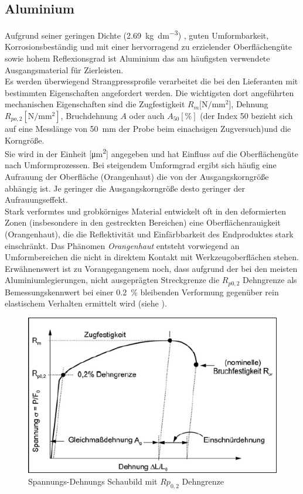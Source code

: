 \documentclass[12pt,a4paper,parskip,twoside,BCOR5mm,headsepline]{scrartcl}
\begin{document}
\subsection{Aluminium}
Aufgrund seiner geringen Dichte (\SI{2.69}{\kilo\gram\per\deci\meter\cubed}) \autocite[353]{wm}, guten Umformbarkeit, Korrosionsbeständig und mit einer hervorragend zu erzielender Oberflächengüte sowie hohem Reflexionsgrad ist Aluminium das am häufigsten verwendete Ausgangsmaterial für Zierleisten.\\
 Es werden überwiegend Strangpressprofile verarbeitet die bei den Lieferanten mit bestimmten Eigenschaften angefordert werden. Die wichtigsten dort angeführten mechanischen Eigenschaften sind die Zugfestigkeit $R_m  [\si{\newton\per\milli\meter\squared}$], Dehnung $R_{po,2} [\si{\newton\per\milli\meter\squared}]$,   Bruchdehnung $A$ oder auch $A_{50} [\si{\percent}]$ (der Index 50 bezieht sich auf eine Messlänge  von \SI{50}{\milli\meter} der Probe  beim einachsigen Zugversuch)\autocite[281]{aa}und die Korngröße.\\
  Sie wird in der Einheit [\si{\micro\meter\squared}] angegeben und hat Einfluss auf die Oberflächengüte nach  Umformprozessen. Bei steigendem Umformgrad ergibt sich häufig eine Aufrauung der Oberfläche (Orangenhaut)\label{sec:orangenhaut} die von der Ausgangskorngröße abhängig ist. Je geringer die Ausgangskorngröße desto geringer der Aufrauungseffekt.\autocite[524]{aa}\\ Stark verformtes und grobkörniges Material entwickelt oft in den deformierten Zonen (insbesondere in den gestreckten Bereichen) eine Oberflächenrauigkeit (Orangenhaut), die die Reflektivität und Einfärbbarkeit des Endproduktes stark einschränkt. Das Phänomen \emph{Orangenhaut} entsteht vorwiegend an Umformbereichen die nicht in direktem Kontakt mit Werkzeugoberflächen stehen.\autocite[19]{hmp}
Erwähnenswert ist zu Vorangegangenem noch, dass aufgrund der bei den meisten Aluminiumlegierungen, nicht ausgeprägten Streckgrenze  die $R_{p0,2}$ Dehngrenze als Bemessungskennwert bei einer \SI{0.2}{\percent} bleibenden Verformung gegenüber rein elastischem Verhalten ermittelt wird (siehe ).
\begin{figure}[hbtp]
\centering
 	\includegraphics[width=.8\textwidth]{spanndehn2}
 	\caption[Spannungs-Dehnungs Schaubild]{Spannungs-Dehnungs Schaubild mit $Rp_{0,2} $ Dehngrenze \autocite[280-281]{aa}}
 	\label{fig:spanndehn2}
 	\end{figure}
 	
\end{document}
